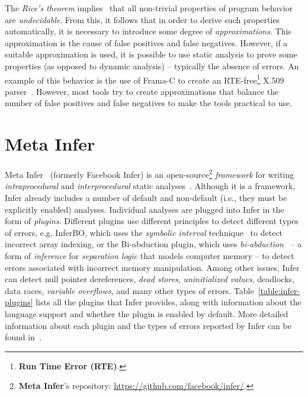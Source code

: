 The \textit{Rice's theorem} implies~\cite{static-analysis-spa} that all non-trivial properties of program behavior are \textit{undecidable}. From this, it follows that in order to derive such properties automatically, it is necessary to introduce some degree of \textit{approximations}. This approximation is the cause of false positives and false negatives. However, if a suitable approximation is used, it is possible to use static analysis to prove some properties (as opposed to dynamic analysis) -- typically the absence of errors. An example of this behavior is the use of Frama-C to create an RTE-free\footnote{\textbf{Run Time Error (RTE)}.} X.509 parser~\cite{RTEFreeParser}. However, most tools try to create approximations that balance the number of false positives and false negatives to make the tools practical to use.


\section{Meta Infer}
\label{infer}
Meta Infer~\cite{infer-web} (formerly Facebook Infer) is an open-source\footnote{\textbf{Meta Infer}'s repository: \url{https://github.com/facebook/infer/}.} \textit{framework} for writing \textit{intraprocedural} and \textit{interprocedural} static analyses~\cite{harmim-dip, marcin-bc, marek-bc}. Although it is a framework, Infer already includes a number of default and non-default (i.e., they must be explicitly enabled) analyses. Individual analyses are plugged into Infer in the form of \textit{plugins}. Different plugins use different principles to detect different types of errors, e.g. InferBO, which uses the \textit{symbolic interval} technique~\cite{InferBO} to detect incorrect array indexing, or the Bi-abduction plugin, which uses \textit{bi-abduction}~\cite{SeparationLogic} -- a form of \textit{inference} for \textit{separation logic} that models computer memory -- to detect errors associated with incorrect memory manipulation. Among other issues, Infer can detect null pointer dereferences, \textit{dead stores}, \textit{uninitialized values}, deadlocks, data races, \textit{variable overflows}, and many other types of errors. Table~\ref{table:infer-plugins} lists all the plugins that Infer provides, along with information about the language support and whether the plugin is enabled by default. More detailed information about each plugin and the types of errors reported by Infer can be found in~\cite{AllIssues}.

